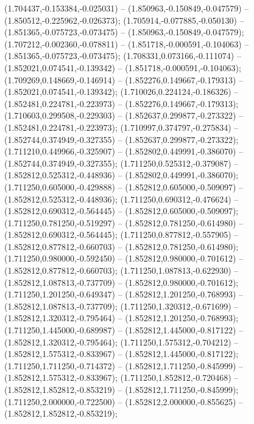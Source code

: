  (1.704437,-0.153384,-0.025031) -- (1.850963,-0.150849,-0.047579) -- (1.850512,-0.225962,-0.026373);
 (1.705914,-0.077885,-0.050130) -- (1.851365,-0.075723,-0.073475) -- (1.850963,-0.150849,-0.047579);
 (1.707212,-0.002360,-0.078811) -- (1.851718,-0.000591,-0.104063) -- (1.851365,-0.075723,-0.073475);
 (1.708331,0.073166,-0.111074) -- (1.852021,0.074541,-0.139342) -- (1.851718,-0.000591,-0.104063);
 (1.709269,0.148669,-0.146914) -- (1.852276,0.149667,-0.179313) -- (1.852021,0.074541,-0.139342);
 (1.710026,0.224124,-0.186326) -- (1.852481,0.224781,-0.223973) -- (1.852276,0.149667,-0.179313);
 (1.710603,0.299508,-0.229303) -- (1.852637,0.299877,-0.273322) -- (1.852481,0.224781,-0.223973);
 (1.710997,0.374797,-0.275834) -- (1.852744,0.374949,-0.327355) -- (1.852637,0.299877,-0.273322);
 (1.711210,0.449966,-0.325907) -- (1.852802,0.449991,-0.386070) -- (1.852744,0.374949,-0.327355);
 (1.711250,0.525312,-0.379087) -- (1.852812,0.525312,-0.448936) -- (1.852802,0.449991,-0.386070);
 (1.711250,0.605000,-0.429888) -- (1.852812,0.605000,-0.509097) -- (1.852812,0.525312,-0.448936);
 (1.711250,0.690312,-0.476624) -- (1.852812,0.690312,-0.564445) -- (1.852812,0.605000,-0.509097);
 (1.711250,0.781250,-0.519297) -- (1.852812,0.781250,-0.614980) -- (1.852812,0.690312,-0.564445);
 (1.711250,0.877812,-0.557905) -- (1.852812,0.877812,-0.660703) -- (1.852812,0.781250,-0.614980);
 (1.711250,0.980000,-0.592450) -- (1.852812,0.980000,-0.701612) -- (1.852812,0.877812,-0.660703);
 (1.711250,1.087813,-0.622930) -- (1.852812,1.087813,-0.737709) -- (1.852812,0.980000,-0.701612);
 (1.711250,1.201250,-0.649347) -- (1.852812,1.201250,-0.768993) -- (1.852812,1.087813,-0.737709);
 (1.711250,1.320312,-0.671699) -- (1.852812,1.320312,-0.795464) -- (1.852812,1.201250,-0.768993);
 (1.711250,1.445000,-0.689987) -- (1.852812,1.445000,-0.817122) -- (1.852812,1.320312,-0.795464);
 (1.711250,1.575312,-0.704212) -- (1.852812,1.575312,-0.833967) -- (1.852812,1.445000,-0.817122);
 (1.711250,1.711250,-0.714372) -- (1.852812,1.711250,-0.845999) -- (1.852812,1.575312,-0.833967);
 (1.711250,1.852812,-0.720468) -- (1.852812,1.852812,-0.853219) -- (1.852812,1.711250,-0.845999);
 (1.711250,2.000000,-0.722500) -- (1.852812,2.000000,-0.855625) -- (1.852812,1.852812,-0.853219);
